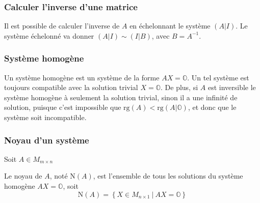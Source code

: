 \subsubsection{Calculer l'inverse d'une matrice}
\noindent
Il est possible de calculer l'inverse de $A$ en échelonnant le système $(A|I)$. Le
système échelonné va donner $(A|I) \sim (I|B)$, avec $B = A^{-1}$.

\subsubsection{Système homogène}
\noindent
Un système homogène est un système de la forme $AX = \mathbb{O}$. Un tel système
est toujours compatible avec la solution trivial $X = \mathbb{O}$. De plus, si $A$ est inversible
le système homogène à seulement la solution trivial, sinon il a une infinité de
solution, puisque c'est impossible que $\text{rg}(A) < \text{rg}(A|\mathbb{O})$,
et donc que le système soit incompatible.

\subsubsection{Noyau d'un système}
\noindent
Soit $A \in M_{m \times n}$
\begin{definition}
    Le noyau de $A$, noté $\text{N}(A)$, est l'ensemble de tous les solutions du système homogène
    $AX = \mathbb{O}$, soit 
    \[ \text{N}(A) = \left\{ X \in M_{n \times 1} \ | \ AX = \mathbb{O}  \right\} \]
\end{definition}